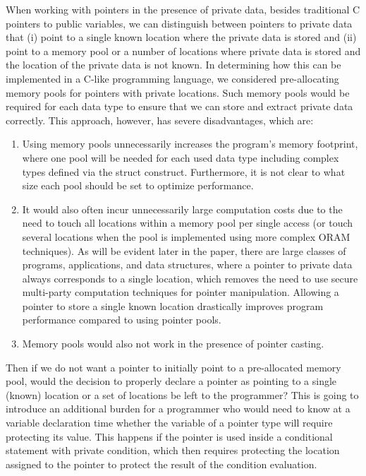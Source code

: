 \documentclass[11pt]{article}
\begin{document}
When working with pointers in the presence of private data, besides
traditional C pointers to public variables, we can distinguish between
pointers to private data that (i) point to a single known location where the
private data is stored and (ii) point to a memory pool or a number of
locations where private data is stored and the location of the private data
is not known. In determining how this can be implemented in a C-like
programming language, we considered pre-allocating memory pools for pointers
with private locations. Such memory pools would be required for each data
type to ensure that we can store and extract private data correctly. This
approach, however, has severe disadvantages, which are: 
\begin{enumerate}
  \item Using memory pools unnecessarily increases the program's memory
    footprint, where one pool will be needed for each used data type
    including complex types defined via the struct construct. Furthermore,
    it is not clear to what size each pool should be set to optimize
    performance. 
  \item It would also often incur unnecessarily large computation
    costs due to the need to touch all locations within a memory pool per
    single access (or touch several locations when the pool is implemented
    using more complex ORAM techniques). As will be evident later in the
    paper, there are large classes of programs, applications, and data
    structures, where a pointer to private data always corresponds to a
    single location, which removes the need to use secure multi-party
    computation techniques for pointer manipulation. Allowing a pointer to
    store a single known location drastically improves program performance
    compared to using pointer pools.
  \item Memory pools would also not work in the presence of pointer
    casting. 
\end{enumerate}

Then if we do not want a pointer to initially point to a pre-allocated memory
pool, would the decision to properly declare a pointer as pointing to a
single (known) location or a set of locations be left to the programmer?
This is going to introduce an additional burden for a programmer who would
need to know at a variable declaration time whether the variable of a
pointer type will require protecting its value. This happens if the pointer
is used inside a conditional statement with private condition, which then 
requires protecting the location assigned to the pointer to protect the
result of the condition evaluation. 
\end{document}
